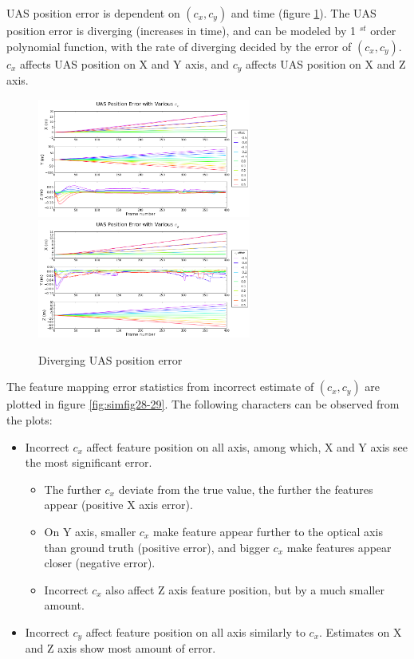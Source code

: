 UAS position error is dependent on $(c_{x}, c_{y})$ and time (figure
\ref{fig:simfig36-37}). The UAS position error is diverging (increases
in time), and can be modeled by 1 $^{st}$ order polynomial function,
with the rate of diverging decided by the error of $(c_{x}, c_{y})$.
$c_{x}$ affects UAS position on X and Y axis, and $c_{y}$ affects UAS
position on X and Z axis.

\begin{figure}[h]
  \centering
  \includegraphics[width=7cm,keepaspectratio=true]{./Figures/SimulationFigures/Figure36.png}
  \includegraphics[width=7cm,keepaspectratio=true]{./Figures/SimulationFigures/Figure37.png}
  \caption{Diverging UAS position error}
  \label{fig:simfig36-37}
\end{figure}

The feature mapping error statistics from incorrect estimate of $
(c_{x}, c_{y})$ are plotted in figure \ref{fig:simfig28-29}. The
following characters can be observed from the plots:

\begin{itemize}
  \item Incorrect $c_{x}$ affect feature position on all axis, among
  which, X and Y axis see the most significant error.
  \begin{itemize}
    \item The further $c_{x}$ deviate from the true value, the further
    the features appear (positive X axis error).
    \item On Y axis, smaller $c_{x}$ make feature appear further to
    the optical axis than ground truth (positive error), and bigger
    $c_{x}$ make features appear closer (negative error).
    \item Incorrect $c_{x}$ also affect Z axis feature position, but
    by a much smaller amount.
  \end{itemize}
  \item Incorrect $c_{y}$ affect feature position on all axis
  similarly to $c_{x}$. Estimates on X and Z axis show most amount of
  error.
\end{itemize}


